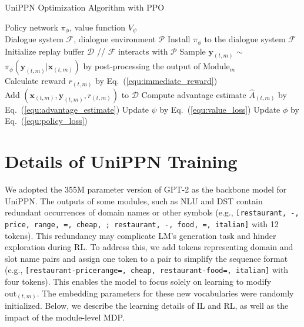\begin{algorithm}[ht]
\caption{UniPPN Optimization Algorithm with PPO}
\label{alg:ppo_algorithm}
\begin{algorithmic}[1] %
\REQUIRE Policy network $\pi_\phi$, value function $V_\psi$\\
\REQUIRE Dialogue system $\mathcal{F}$, dialogue environment $\mathcal{P}$
\STATE Install $\pi_\phi$ to the dialogue system $\mathcal{F}$\\
\STATE Initialize replay buffer $\mathcal{D}$
\STATE // $\mathcal{F}$ interacts with $\mathcal{P}$
\STATE Sample $\bm{y}_{(t,m)}$ $\sim$ $\pi_\phi(\bm{y}_{(t,m)} | \bm{x}_{(t,m)})$ by post-processing the output of $\text{Module}_m$ \\
\STATE Calculate reward $r_{(t,m)}$ by Eq.~(\ref{equ:immediate_reward})\\
\STATE Add $(\bm{x}_{(t,m)}, \bm{y}_{(t,m)}, r_{(t,m)})$ to $\mathcal{D}$
\ENDFOR
\ENDFOR
\ENDWHILE
\STATE Compute advantage estimate $\hat{A}_{(t,m)}$ by Eq.~(\ref{equ:advantage_estimate})
\STATE Update $\psi$ by Eq.~(\ref{equ:value_loss})
\STATE Update $\phi$ by Eq.~(\ref{equ:policy_loss})
\ENDFOR
\ENDFOR
\end{algorithmic}
\end{algorithm}


\section{Details of UniPPN Training}
\label{appendix:sec:details_unippn_training}
We adopted the 355M parameter version of GPT-2 as the backbone model for UniPPN. The outputs of some modules, such as NLU and DST contain redundant occurrences of domain names or other symbols (e.g., \texttt{[restaurant, -, price, range, =, cheap, ; restaurant, -, food, =, italian]} with 12 tokens). This redundancy may complicate LM's generation task and hinder exploration during RL. To address this, we add tokens representing domain and slot name pairs and assign one token to a pair to simplify the sequence format (e.g., \texttt{[restaurant-pricerange=, cheap, restaurant-food=, italian]} with four tokens). This enables the model to focus solely on learning to modify $\text{out}_{(t,m)}$. The embedding parameters for these new vocabularies were randomly initialized. Below, we describe the learning details of IL and RL, as well as the impact of the module-level MDP.

